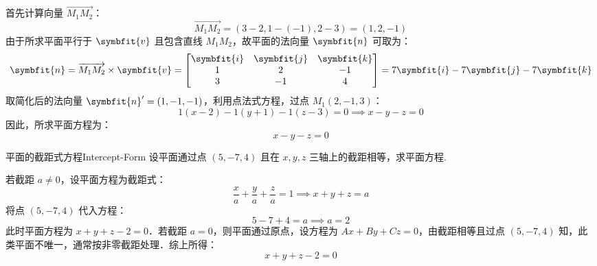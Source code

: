 \begin{solution}
    首先计算向量 $\overrightarrow{M_1 M_2}$：
    \begin{equation}
        \overrightarrow{M_1 M_2} = (3-2, 1-(-1), 2-3) = (1, 2, -1)
    \end{equation}
    由于所求平面平行于 $\symbfit{v}$ 且包含直线 $M_1 M_2$，故平面的法向量 $\symbfit{n}$ 可取为：
    \begin{equation}
        \symbfit{n} = \overrightarrow{M_1 M_2} \times \symbfit{v} = \begin{bmatrix} \symbfit{i} & \symbfit{j} & \symbfit{k} \\ 1 & 2 & -1 \\ 3 & -1 & 4 \end{bmatrix} = 7\symbfit{i} - 7\symbfit{j} - 7\symbfit{k}
    \end{equation}
    取简化后的法向量 $\symbfit{n}' = (1, -1, -1)$，利用点法式方程，过点 $M_1(2, -1, 3)$：
    \begin{equation}
        1(x - 2) - 1(y + 1) - 1(z - 3) = 0 \implies x - y - z = 0
    \end{equation}
    因此，所求平面方程为：
    \begin{equation}
        \boxed{x - y - z = 0}
    \end{equation}
\end{solution}

\begin{problem}{平面的截距式方程}{Intercept-Form}
    设平面通过点 $(5, -7, 4)$ 且在 $x, y, z$ 三轴上的截距相等，求平面方程.
\end{problem}

\begin{solution}
    若截距 $a \neq 0$，设平面方程为截距式：
    \begin{equation}
        \frac{x}{a} + \frac{y}{a} + \frac{z}{a} = 1 \implies x + y + z = a
    \end{equation}
    将点 $(5, -7, 4)$ 代入方程：
    \begin{equation}
        5 - 7 + 4 = a \implies a = 2
    \end{equation}
    此时平面方程为 $x + y + z - 2 = 0$．若截距 $a = 0$，则平面通过原点，设方程为 $Ax + By + Cz = 0$，由截距相等且过点 $(5, -7, 4)$ 知，此类平面不唯一，通常按非零截距处理．综上所得：
    \begin{equation}
        \boxed{x + y + z - 2 = 0}
    \end{equation}
\end{solution}

